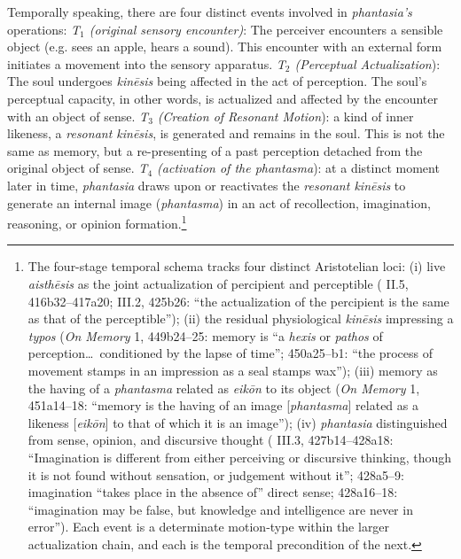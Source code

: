 \documentclass{article}
\begin{document}
Temporally speaking, there are four distinct events involved in \textit{phantasia's} operations: \textit{T$_1$ (original sensory encounter)}: The perceiver encounters a sensible object (e.g. sees an apple, hears a sound). This encounter with an external form initiates a movement into the sensory apparatus. \textit{T$_2$ (Perceptual Actualization}): The soul undergoes \textit{kinēsis} being affected in the act of perception. The soul's perceptual capacity, in other words, is actualized and affected by the encounter with an object of sense. \textit{T$_3$ (Creation of Resonant Motion}): a kind of inner likeness, a \textit{resonant kinēsis}, is generated and remains in the soul. This is not the same as memory, but a re-presenting of a past perception detached from the original object of sense. \textit{T$_4$ (activation of the phantasma}): at a distinct moment later in time, \textit{phantasia} draws upon or reactivates the \textit{resonant kinēsis} to generate an internal image (\textit{phantasma}) in an act of recollection, imagination, reasoning, or opinion formation.\footnote{The four-stage temporal schema tracks four distinct Aristotelian loci: (i) live \textit{aisth\=esis} as the joint actualization of percipient and perceptible (\cite{aristotle2014soul} II.5, 416b32--417a20; III.2, 425b26: ``the actualization of the percipient is the same as that of the perceptible''); (ii) the residual physiological \textit{kin\=esis} impressing a \textit{typos} (\textit{On Memory} 1, 449b24--25: memory is ``a \textit{hexis} or \textit{pathos} of perception\ldots\ conditioned by the lapse of time''; 450a25--b1: ``the process of movement stamps in an impression as a seal stamps wax''); (iii) memory as the having of a \textit{phantasma} related as \textit{eik\=on} to its object (\textit{On Memory} 1, 451a14--18: ``memory is the having of an image [\textit{phantasma}] related as a likeness [\textit{eik\=on}] to that of which it is an image''); (iv) \textit{phantasia} distinguished from sense, opinion, and discursive thought (\cite{aristotle2014soul} III.3, 427b14--428a18: ``Imagination is different from either perceiving or discursive thinking, though it is not found without sensation, or judgement without it''; 428a5--9: imagination ``takes place in the absence of'' direct sense; 428a16--18: ``imagination may be false, but knowledge and intelligence are never in error''). Each event is a determinate motion-type within the larger actualization chain, and each is the temporal precondition of the next.} 
\end{document}
